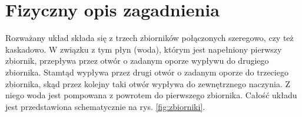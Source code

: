 \chapter{Fizyczny opis zagadnienia}
\label{cha:model}

\newtheorem{torricelli}{Prawo Torricellego}[chapter]
\newtheorem{mass}{Prawo zachowania masy}[chapter]

Rozważany układ składa się z trzech zbiorników połączonych szeregowo, czy też kaskadowo.
W związku z tym płyn (woda), którym jest napełniony pierwszy zbiornik, przepływa przez otwór o zadanym oporze wypływu do drugiego zbiornika.
Stamtąd wypływa przez drugi otwór o zadanym oporze do trzeciego zbiornika, skąd przez kolejny taki otwór wypływa do zewnętrznego naczynia.
Z niego woda jest pompowana z powrotem do pierwszego zbiornika.
Całość układu jest przedstawiona schematycznie na rys. \ref{fig:zbiorniki}.


